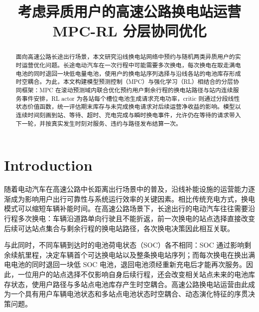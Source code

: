 \documentclass[12pt,a4paper,UTF8]{ctexart}
\begin{document}
\cover

\newpage
\begin{abstract}

面向高速公路长途出行场景，本文研究沿线换电站网络中预约与随机两类异质用户的实时运营优化问题。长途电动汽车在一次行程中可能需要多次换电，每次换电在取走满电电池的同时退回一块低电量电池，使用户的换电站序列选择与沿线各站的电池库存形成时空耦合。为此，本文构建模型预测控制（MPC）与强化学习（RL）相结合的分层协同框架：MPC 在滚动预测域内联合优化预约用户剩余行程的换电站路径与站内连续服务事件安排，RL actor 为各站每个槽位电池生成请求充电功率，critic 则通过分段线性状态价值函数，统一评估期末库存与未完成换电请求对后续运营净收益的影响。模型以连续时间刻画到站、等待、超时、充电完成与瞬时换电事件，允许仍在等待的请求带入下一轮，并按真实发生时刻对服务、违约与路径发布结算一次。

\end{abstract}
\newpage

\thispagestyle{empty} %

\newpage
\tableofcontents

\newpage

\begin{center}
   \title{ \Huge \textbf{{考虑异质用户的高速公路换电站运营 MPC-RL 分层协同优化}}}
\end{center}


\section{Introduction}
随着电动汽车在高速公路中长距离出行场景中的普及，沿线补能设施的运营能力逐渐成为影响用户出行可靠性与系统运行效率的关键因素。相比传统充电方式，换电模式可以缩短车辆补能时间。在高速公路场景下，长途出行的电动汽车往往需要沿行程多次换电：车辆沿道路单向行驶且不能折返，前一次换电的站点选择直接改变后续可达站点集合与剩余行程的换电站路径，各次换电决策因此相互关联。

与此同时，不同车辆到达时的电池荷电状态（SOC）各不相同：SOC 通过影响剩余续航里程，决定车辆首个可达换电站以及整条换电站序列；而每次换电在换出满电电池的同时退回一块低 SOC 电池，退回电池须经重新充电后才能再次服务。因此，一位用户的站点选择不仅影响自身后续行程，还会改变相关站点未来的电池库存状态，使用户路径与多站点电池库存产生时空耦合。高速公路换电站运营由此成为一个具有用户车辆电池状态和多站点电池状态时空耦合、动态演化特征的序贯决策问题。
\end{document}
